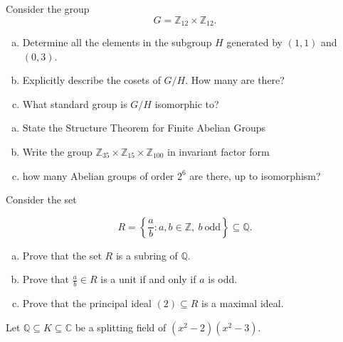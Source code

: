 \documentclass[11pt]{exam}
\theoremstyle{definition}
\begin{document}
\begin{questions}
\newpage
\question[10]\mbox{}

Consider the group
$$G = \mathbb Z_{12}\times\mathbb Z_{12}.$$

\begin{enumerate}[(a)]
\item Determine all the elements in the subgroup $H$ generated by $(1,1)$ and $(0,3)$.
\vspace{3in}
\item Explicitly describe the cosets of $G/H$.  How many are there?
\vspace{3in}
\item What standard group is $G/H$ isomorphic to?
\end{enumerate}


\newpage
\question[10]\mbox{}

\begin{enumerate}[(a)]
\item State the Structure Theorem for Finite Abelian Groups
\vspace{3in}
\item Write the group $\mathbb Z_{35}\times \mathbb Z_{15}\times\mathbb Z_{100}$ in invariant factor form
\vspace{3in}
\item how many Abelian groups of order $2^6$ are there, up to isomorphism?
\end{enumerate}

\newpage
\question[10]\mbox{}

Consider the set

$$R = \left\lbrace\frac{a}{b}: a,b\in\mathbb Z,\ b\ \text{odd}\right\rbrace\subseteq \mathbb Q.$$

\begin{enumerate}[(a)]
\item Prove that the set $R$ is a subring of $\mathbb Q$.
\vspace{3in}
\item Prove that $\frac{a}{b}\in R$ is a unit if and only if $a$ is odd.
\vspace{3in}
\item Prove that the principal ideal $(2)\subseteq R$ is a maximal ideal.
\end{enumerate}

\newpage
\question[10]\mbox{}

Let $\mathbb Q\subseteq K\subseteq \mathbb C$ be a splitting field of $(x^2-2)(x^2-3)$.


\end{questions}
\end{document}
